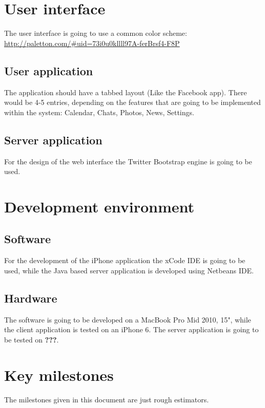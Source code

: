 \chapter{User interface}

The user interface is going to use a common color scheme: \url{http://paletton.com/#uid=73i0u0kllll97A-ferBrsf4-F8P}

\section{User application}
The application should have a tabbed layout (Like the Facebook app). There would be 4-5 entries, depending on the features that are going to be implemented within the system: Calendar, Chats, Photos, News, Settings.

\section{Server application}

For the design of the web interface the Twitter Bootstrap engine is going to be used.

\chapter{Development environment}

\section{Software}

For the development of the iPhone application the xCode IDE is going to be used, while the Java based server application is developed using Netbeans IDE.

\section{Hardware}

The software is going to be developed on a MacBook Pro Mid 2010, 15", while the client application is tested on an iPhone 6. The server application is going to be tested on \textbf{???}.

\chapter{Key milestones}

The milestones given in this document are just rough estimators.


